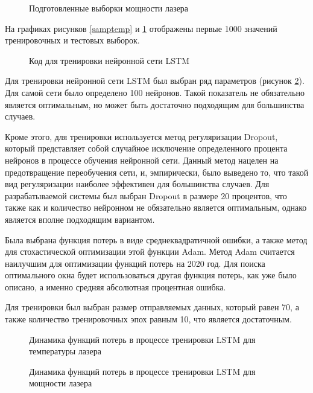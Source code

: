 \begin{figure}[H]
    \caption{Подготовленные выборки мощности лазера}
    \label{sampwer}
\end{figure}

На графиках рисунков \ref{samptemp} и \ref{sampwer} отображены
первые 1000 значений тренировочных и тестовых выборок.


\begin{figure}[H]
    \caption{Код для тренировки нейронной сети LSTM}
    \label{lstmfit}
\end{figure}

Для тренировки нейронной сети LSTM был выбран ряд параметров (рисунок \ref{lstmfit}).
Для самой сети было определено 100 нейронов. Такой показатель не обязательно является оптимальным,
но может быть достаточно подходящим для большинства случаев.

Кроме этого, для тренировки используется метод регуляризации Dropout,
который представляет собой случайное исключение определенного процента нейронов
в процессе обучения нейронной сети.
Данный метод нацелен на предотвращение переобучения сети,
и, эмпирически, было выведено то, что такой вид регуляризации наиболее эффективен
для большинства случаев.
Для разрабатываемой системы был выбран Dropout в размере 20 процентов,
что также как и количество нейронном не обязательно является оптимальным,
однако является вполне подходящим вариантом.

Была выбрана функция потерь в виде среднеквадратичной ошибки,
а также метод для стохастической оптимизации этой функции Adam.
Метод Adam считается наилучшим для оптимизации функций потерь
на 2020 год.
Для поиска оптимального окна будет использоваться другая функция потерь,
как уже было описано, а именно средняя абсолютная процентная ошибка.

Для тренировки был выбран размер отправляемых данных,
который равен 70, а также количество тренировочных эпох равным 10,
что является достаточным.

\begin{figure}[H]
    \caption{Динамика функций потерь в процессе тренировки LSTM для температуры лазера}
    \label{losstemp}
\end{figure}

\begin{figure}[H]
    \caption{Динамика функций потерь в процессе тренировки LSTM для мощности лазера}
    \label{losspower}
\end{figure}


